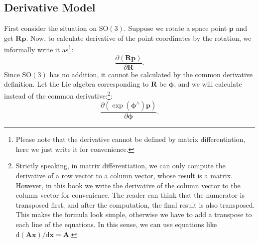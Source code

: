 \subsection{Derivative Model}
First consider the situation on $\mathrm{SO}(3)$. Suppose we rotate a space point $\mathbf{p}$ and get $\mathbf{R} \mathbf{p}$. Now, to calculate derivative of the point coordinates by the rotation, we informally write it as\footnote{Please note that the derivative cannot be defined by matrix differentiation, here we just write it for convenience. }:
\[
\frac{{\partial \left( {\mathbf{Rp}} \right)}}{{\partial \mathbf{R}}}.
\]
Since $\mathrm{SO}(3)$ has no addition, it cannot be calculated by the common derivative definition. Let the Lie algebra corresponding to $\mathbf{R}$ be $\boldsymbol{\phi}$, and we will calculate instead of the common derivative:\footnote{Strictly speaking, in matrix differentiation, we can only compute the derivative of a row vector to a column vector, whose result is a matrix. However, in this book we write the derivative of the column vector to the column vector for convenience. The reader can think that the numerator is transposed first, and after the computation, the final result is also transposed. This makes the formula look simple, otherwise we have to add a transpose to each line of the equations. In this sense, we can use equations like $\mathrm{d}(\mathbf{Ax})/\mathrm{d}\mathbf{x} = \mathbf{A}$. }:
\[ \frac{{\partial \left( {\exp \left( \boldsymbol{\phi} ^ \wedge \right) \mathbf{p}} \right)}}{{\partial \boldsymbol{\phi} }}. \]

